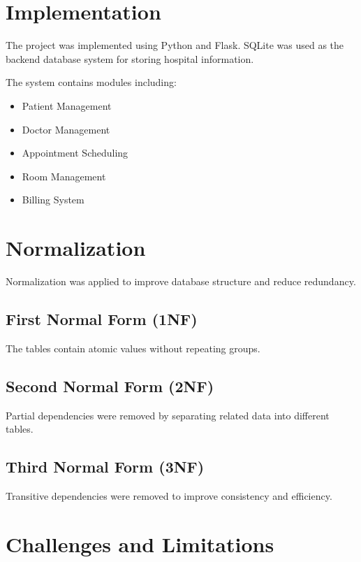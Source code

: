 \documentclass[conference]{IEEEtran}
\begin{document}
\section{Implementation}

The project was implemented using Python and Flask. SQLite was used as the backend database system for storing hospital information.

The system contains modules including:

\begin{itemize}
    \item Patient Management
    \item Doctor Management
    \item Appointment Scheduling
    \item Room Management
    \item Billing System
\end{itemize}

\section{Normalization}

Normalization was applied to improve database structure and reduce redundancy.

\subsection{First Normal Form (1NF)}

The tables contain atomic values without repeating groups.

\subsection{Second Normal Form (2NF)}

Partial dependencies were removed by separating related data into different tables.

\subsection{Third Normal Form (3NF)}

Transitive dependencies were removed to improve consistency and efficiency.

\section{Challenges and Limitations}
\end{document}
